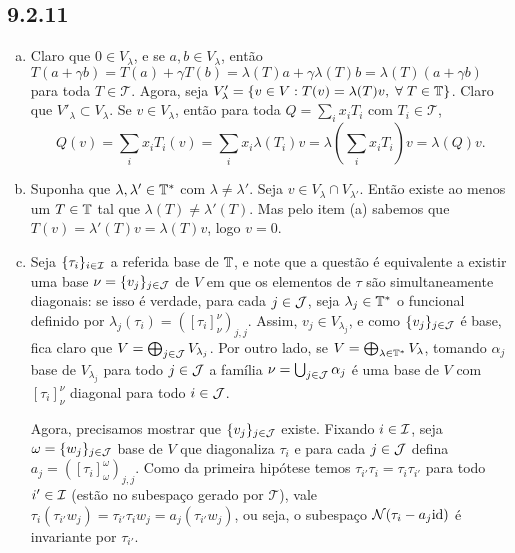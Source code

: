 \documentclass[../main.tex]{subfiles}
\begin{document}
\subsection*{9.2.11}
\begin{enumerate}[(a)]
    \item Claro que $0\in V_\lambda$, e se $a,b\in V_\lambda$, então $T(a+\gamma b)=T(a)+\gamma T(b)=\lambda(T)a+\gamma\lambda(T)b=\lambda(T)(a+\gamma b)$ para toda $T\in\mathcal{T}$. Agora, seja $V_\lambda'=\{v\in V:T(v)=\lambda(T)v,\;\forall\;T\in\mathbb{T}\}$. Claro que $V'_\lambda\subset V_\lambda$. Se $v\in V_\lambda$, então para toda $Q=\sum_i x_iT_i$ com $T_i\in\mathcal{T}$,
          \[Q(v)=\sum_i x_iT_i(v)=\sum_ix_i\lambda(T_i)v=\lambda\left(\sum_ix_iT_i\right)v=\lambda(Q)v.\]
    \item Suponha que $\lambda,\lambda'\in\mathbb{T}^*$ com $\lambda\neq\lambda'$. Seja $v\in V_\lambda\cap V_{\lambda'}$. Então existe ao menos um $T\in\mathbb{T}$ tal que $\lambda(T)\neq\lambda'(T)$. Mas pelo item (a) sabemos que $T(v)=\lambda'(T)v=\lambda(T)v$, logo $v=0$.
    \item Seja $\{\tau_i\}_{i\in\mathcal{I}}$ a referida base de $\mathbb{T}$, e note que a questão é equivalente a existir uma base $\nu=\{v_j\}_{j\in\mathcal{J}}$ de $V$ em que os elementos de $\tau$ são simultaneamente diagonais: se isso é verdade, para cada $j\in\mathcal{J}$,  seja $\lambda_j\in\mathbb{T}^*$ o funcional definido por $\lambda_j(\tau_i)=([\tau_i]_\nu^\nu)_{j,j}$. Assim, $v_j\in V_{\lambda_j}$, e como $\{v_j\}_{j\in\mathcal{J}}$ é base, fica claro que $V=\bigoplus_{j\in\mathcal{J}}V_{\lambda_j}$. Por outro lado, se $V=\bigoplus_{\lambda\in\mathbb{T}^*}V_\lambda$, tomando $\alpha_j$ base de $V_{\lambda_j}$ para todo $j\in\mathcal{J}$ a família $\nu=\bigcup_{j\in\mathcal{J}}\alpha_j$ é uma base de $V$ com $[\tau_i]_\nu^\nu$ diagonal para todo $i\in\mathcal{J}$.
    
    Agora, precisamos mostrar que $\{v_j\}_{j\in\mathcal{J}}$ existe. Fixando $i\in\mathcal{I}$, seja $\omega=\{w_j\}_{j\in\mathcal{J}}$ base de $V$ que diagonaliza $\tau_i$ e para cada $j\in\mathcal{J}$ defina $a_j=([\tau_i]_\omega^\omega)_{j,j}$. Como da primeira hipótese temos $\tau_{i'}\tau_i=\tau_i\tau_{i'}$ para todo $i'\in\mathcal{I}$ (estão no subespaço gerado por $\mathcal{T}$), vale $\tau_i(\tau_{i'}w_j)=\tau_{i'}\tau_iw_j=a_j(\tau_{i'}w_j)$, ou seja, o subespaço $\mathcal{N}(\tau_i-a_j\textrm{id})$ é invariante por $\tau_{i'}$.
\end{enumerate}
\end{document}

